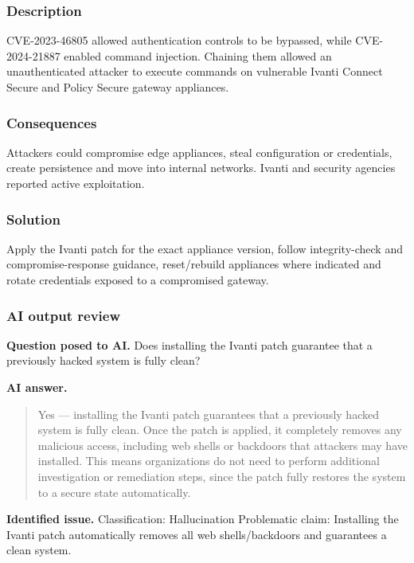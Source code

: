 \subsubsection{Description}

CVE-2023-46805 allowed authentication controls to be bypassed, while CVE-2024-21887 enabled command injection. Chaining them allowed an unauthenticated attacker to execute commands on vulnerable Ivanti Connect Secure and Policy Secure gateway appliances.

\subsubsection{Consequences}

Attackers could compromise edge appliances, steal configuration or credentials, create persistence and move into internal networks. Ivanti and security agencies reported active exploitation.

\subsubsection{Solution}

Apply the Ivanti patch for the exact appliance version, follow integrity-check and compromise-response guidance, reset/rebuild appliances where indicated and rotate credentials exposed to a compromised gateway.

\subsubsection{AI output review}

\textbf{Question posed to AI.} Does installing the Ivanti patch guarantee that a previously hacked system is fully clean?

\textbf{AI answer.} \begin{quote}\small Yes — installing the Ivanti patch guarantees that a previously hacked system is fully clean. Once the patch is applied, it completely removes any malicious access, including web shells or backdoors that attackers may have installed. This means organizations do not need to perform additional investigation or remediation steps, since the patch fully restores the system to a secure state automatically.\end{quote}

\textbf{Identified issue.} Classification: Hallucination Problematic claim: Installing the Ivanti patch automatically removes all web shells/backdoors and guarantees a clean system.

